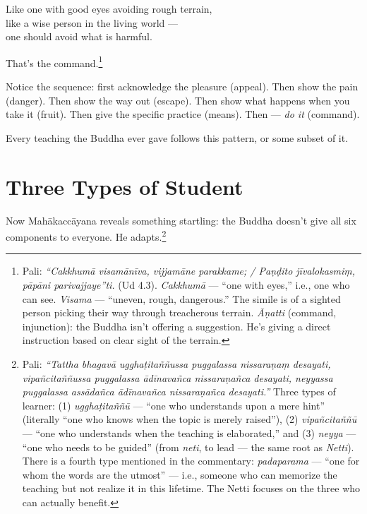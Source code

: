 \begin{versebox}
Like one with good eyes avoiding rough terrain,\\
like a wise person in the living world ---\\
one should avoid what is harmful.
\end{versebox}

That's the command.\footnote{Pali: \textit{``Cakkhumā visamānīva, vijjamāne parakkame; / Paṇḍito jīvalokasmiṃ, pāpāni parivajjaye''ti.} (Ud 4.3). \textit{Cakkhumā} --- ``one with eyes,'' i.e., one who can see. \textit{Visama} --- ``uneven, rough, dangerous.'' The simile is of a sighted person picking their way through treacherous terrain. \textit{Āṇatti} (command, injunction): the Buddha isn't offering a suggestion. He's giving a direct instruction based on clear sight of the terrain.}

Notice the sequence: first acknowledge the pleasure (appeal). Then show the pain (danger). Then show the way out (escape). Then show what happens when you take it (fruit). Then give the specific practice (means). Then --- \textit{do it} (command).

Every teaching the Buddha ever gave follows this pattern, or some subset of it.

\section*{Three Types of Student}

Now Mahākaccāyana reveals something startling: the Buddha doesn't give all six components to everyone. He adapts.\footnote{Pali: \textit{``Tattha bhagavā ugghaṭitaññussa puggalassa nissaraṇaṃ desayati, vipañcitaññussa puggalassa ādīnavañca nissaraṇañca desayati, neyyassa puggalassa assādañca ādīnavañca nissaraṇañca desayati.''} Three types of learner: (1) \textit{ugghaṭitaññū} --- ``one who understands upon a mere hint'' (literally ``one who knows when the topic is merely raised''), (2) \textit{vipañcitaññū} --- ``one who understands when the teaching is elaborated,'' and (3) \textit{neyya} --- ``one who needs to be guided'' (from \textit{neti}, to lead --- the same root as \textit{Netti}). There is a fourth type mentioned in the commentary: \textit{padaparama} --- ``one for whom the words are the utmost'' --- i.e., someone who can memorize the teaching but not realize it in this lifetime. The Netti focuses on the three who can actually benefit.}

